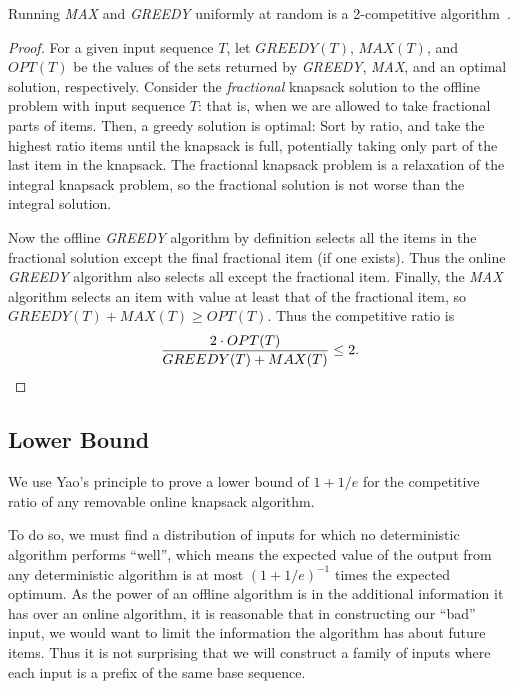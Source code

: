 \begin{theorem}
	Running \emph{MAX} and \emph{GREEDY} uniformly at random is a 2-competitive algorithm~\cite{han}.
\end{theorem}
\begin{proof}
	For a given input sequence $T$, let $GREEDY(T)$, $MAX(T)$, and $OPT(T)$ be the values of the sets returned by \emph{GREEDY}, \emph{MAX}, and an optimal solution, respectively. Consider the \emph{fractional} knapsack solution to the offline problem with input sequence $T$: that is, when we are allowed to take fractional parts of items. Then, a greedy solution is optimal: Sort by ratio, and take the highest ratio items until the knapsack is full, potentially taking only part of the last item in the knapsack. The fractional knapsack problem is a relaxation of the integral knapsack problem, so the fractional solution is not worse than the integral solution.

	Now the offline \emph{GREEDY} algorithm by definition selects all the items in the fractional solution except the final fractional item (if one exists). Thus the online \emph{GREEDY} algorithm also selects all except the fractional item. Finally, the \emph{MAX} algorithm selects an item with value at least that of the fractional item, so $GREEDY(T)+MAX(T) \ge OPT(T)$. Thus the competitive ratio is
\begin{equation*}
\frac{2\cdot OPT(T)}{GREEDY(T)+MAX(T)} \le 2.\qedhere
\end{equation*}
\end{proof}

\subsection{Lower Bound}
We use Yao's principle to prove a lower bound of $1+1/e$ for the competitive ratio of any removable online knapsack algorithm.

To do so, we must find a distribution of inputs for which no deterministic algorithm performs ``well'', which means the expected value of the output from any deterministic algorithm is at most $(1+1/e)^{-1}$ times the expected optimum. As the power of an offline algorithm is in the additional information it has over an online algorithm, it is reasonable that in constructing our ``bad'' input, we would want to limit the information the algorithm has about future items. Thus it is not surprising that we will construct a family of inputs where each input is a prefix of the same base sequence.

